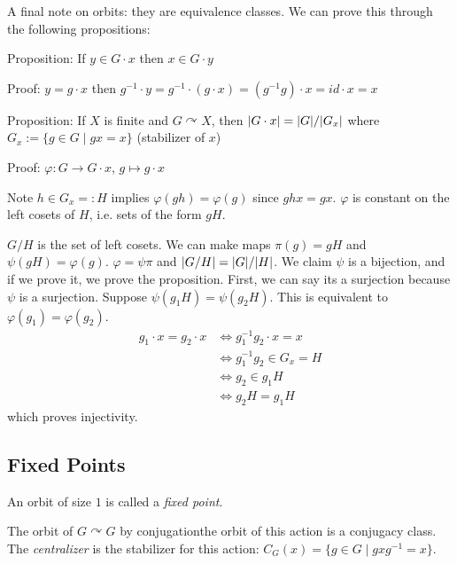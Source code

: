 \documentclass[a4paper,twoside,master.tex]{subfiles}
\begin{document}

A final note on orbits: they are equivalence classes. We can prove this through the following propositions:


Proposition: If $ y \in G \cdot x $ then $ x \in G \cdot y $

Proof: $ y = g \cdot x $ then $ g^{-1} \cdot y = g^{-1} \cdot (g \cdot x) = (g^{-1} g) \cdot x = id \cdot x = x $

Proposition: If $ X $ is finite and $ G \curvearrowright X $, then $ \abs{G \cdot x} = \abs{G} / \abs{G_x} $ where $ G_x := \{g \in G \mid gx = x\} $ (stabilizer of $ x $)

Proof: $ \varphi: G \to G \cdot x $, $ g \mapsto g \cdot x $

\begin{note}{Note}
    $ h \in G_x =: H $ implies $ \varphi(gh) = \varphi(g) $ since $ ghx = gx $. $ \varphi $ is constant on the left cosets of $ H $, i.e. sets of the form $ gH $.
\end{note}

$ G/H $ is the set of left cosets. We can make maps $ \pi(g) = gH $ and $ \psi(gH) = \varphi(g) $. $ \varphi = \psi \pi $ and $ \abs{G/H} = \abs{G} / \abs{H} $. We claim $ \psi $ is a bijection, and if we prove it, we prove the proposition. First, we can say its a surjection because $ \psi $ is a surjection. Suppose $ \psi(g_1 H) = \psi(g_2 H) $. This is equivalent to $ \varphi(g_1) = \varphi(g_2) $.
\begin{align}
    g_1 \cdot x = g_2 \cdot x &\Leftrightarrow g_1^{-1} g_2 \cdot x = x\\
    &\Leftrightarrow g_1^{-1} g_2 \in G_x = H\\
    &\Leftrightarrow g_2 \in g_1 H\\
    &\Leftrightarrow g_2 H = g_1 H
\end{align}
which proves injectivity.

\subsection{Fixed Points}
\label{sub:fixed_points}

\begin{definition}
    An orbit of size $ 1 $ is called a \textit{fixed point}.
\end{definition}

\begin{definition}
    The orbit of $ G\curvearrowright G $ by conjugation\textemdash the orbit of this action is a conjugacy class. The \textit{centralizer} is the stabilizer for this action: $ C_G(x) = \{g \in G \mid gxg^{-1} = x\} $.
\end{definition}
\end{document}
